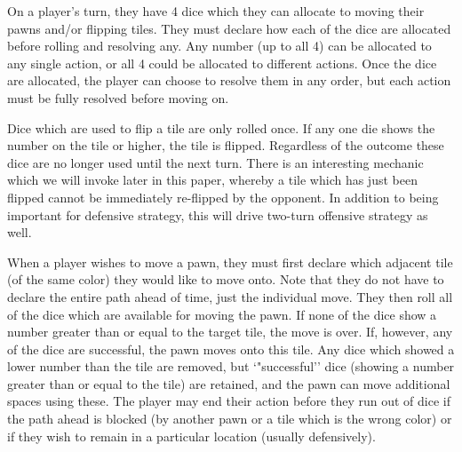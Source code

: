 \documentclass[letterpaper,11pt]{article}
\begin{document}
On a player's turn, they have 4 dice which they can allocate to moving their
pawns and/or flipping tiles.  They must declare how each of the dice are 
allocated before rolling and resolving any.  Any number (up to all 4) can be
allocated to any single action, or all 4 could be allocated to different
actions.  Once the dice are allocated, the player can choose to resolve them
in any order, but each action must be fully resolved before moving on.

Dice which are used to flip a tile are only rolled once.  If any one die shows
the number on the tile or higher, the tile is flipped.  Regardless of the
outcome these dice are no longer used until the next turn.  There is an
interesting mechanic which we will invoke later in this paper, whereby a tile
which has just been flipped cannot be immediately re-flipped by the opponent.
In addition to being important for defensive strategy, this will drive
two-turn offensive strategy as well.

When a player wishes to move a pawn, they must first declare which adjacent
tile (of the same color) they would like to move onto.  Note that they do not 
have to declare the entire path ahead of time, just the individual move.  They
then roll all of the dice which are available for moving the pawn.  If none of
the dice show a number greater than or equal to the target tile, the move is
over.  If, however, any of the dice are successful, the pawn moves onto this
tile.  Any dice which showed a lower number than the tile are removed, but
`"successful'' dice (showing a number greater than or equal to the tile) are
retained, and the pawn can move additional spaces using these.  The player may
end their action before they run out of dice if the path ahead is blocked (by
another pawn or a tile which is the wrong color) or if they wish to remain in
a particular location (usually defensively).
\end{document}

